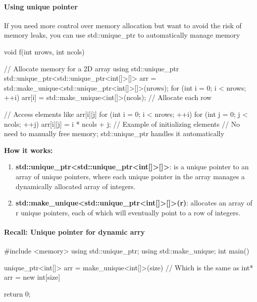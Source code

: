 \documentclass{report}
\begin{document}
    \paragraph{Using unique pointer}
    \bigbreak \noindent \bigbreak \noindent 
    If you need more control over memory allocation but want to avoid the risk of memory leaks, you can use std::unique\_ptr to automatically manage memory
    \bigbreak \noindent 
    \begin{cppcode}
        void f(int nrows, int ncols) {
            // Allocate memory for a 2D array using std::unique_ptr
            std::unique_ptr<std::unique_ptr<int[]>[]> arr = std::make_unique<std::unique_ptr<int[]>[]>(nrows);
            for (int i = 0; i < nrows; ++i) {
                arr[i] = std::make_unique<int[]>(ncols);  // Allocate each row
            }

            // Access elements like arr[i][j]
            for (int i = 0; i < nrows; ++i) {
                for (int j = 0; j < ncols; ++j) {
                    arr[i][j] = i * ncols + j;  // Example of initializing elements
                }
            }
            // No need to manually free memory; std::unique_ptr handles it automatically
        }
    \end{cppcode}
    \bigbreak \noindent 
    \textbf{How it works:}
    \begin{enumerate}
        \item \textbf{std::unique\_ptr<std::unique\_ptr<int[]>[]>}: is a unique pointer to an array of unique pointers, where each unique pointer in the array manages a dynamically allocated array of integers.
        \item \textbf{std::make\_unique<std::unique\_ptr<int[]>[]>(r)}: allocates an array of r unique pointers, each of which will eventually point to a row of integers.
    \end{enumerate}

    \bigbreak \noindent 
    \paragraph{Recall: Unique pointer for dynamic arry}
    \bigbreak \noindent 
    \bigbreak \noindent 
    \bigbreak \noindent 
    \begin{cppcode}
    #include <memory>
    using std::unique_ptr;
    using std::make_unique;
    int main() {
        unique_ptr<int[]> arr = make_unique<int[]>(size) // Which is the same as int* arr = new int[size]

        return 0;
}
    \end{cppcode}
\end{document}

